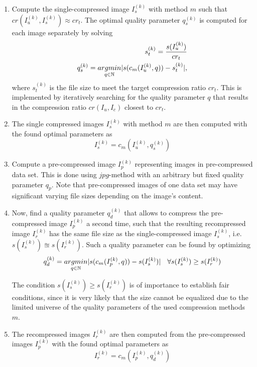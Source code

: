 \documentclass[10pt,twocolumn,letterpaper]{article}
\begin{document}
\begin{enumerate}
	\item Compute the single-compressed image $I_s^{(k)}$ with method $m$ such that $cr(I_u^{(k)}, I_s^{(k)}) \approx cr_t$. The optimal quality parameter $q_s^{(k)}$ is computed for each image separately by solving
	\begin{eqnarray}
	\small
	s_t^{(k)} = \frac{s(I_u^{(k)})}{cr_t} \\
		q_s^{(k)} = \underset{q \in \mathbb{N}}{argmin}|s(c_m(I_u^{(k)},q)) - s_t^{(k)}|,
	\end{eqnarray} where $s_t^{(k)}$ is the file size to meet the target compression ratio $cr_t$. This is implemented by iteratively searching for the quality parameter $q$ that results in the compression ratio $cr(I_u, I_c)$ closest to $cr_t$. 
	\item The single compressed images $I_s^{(k)}$ with method $m$ are then computed with the found optimal parameters as
	\begin{equation}
	I_s^{(k)} = c_m(I_u^{(k)}, q_s^{(k)})
	\end{equation}
	
	\item Compute a pre-compressed image $I_p^{(k)}$ representing images in pre-compressed data set. This is done using $jpg$-method \cite{jpg} with an arbitrary but fixed quality parameter $q_p$. Note that pre-compressed images of one data set may have significant varying file sizes depending on the image's content.
	
	\item Now, find a quality parameter $q_d^{(k)}$ that allows to compress the pre-compressed image $I_p^{(k)}$ a second time, such that the resulting recompressed image $I_r^{(k)}$ has the same file size as the single-compressed image $I_s^{(k)}$, i.e. $s(I_s^{(k)}) \approxeq s(I_r^{(k)})$. Such a quality parameter can be found by optimizing
	\begin{equation}
	\small
		q_d^{(k)} = \underset{q \in \mathbb{N}}{argmin}|s(c_m(I_p^{(k)},q)) - s(I_s^{(k)})| \quad \forall s(I_s^{(k)}) \geq s(I_r^{(k)})
	\end{equation}
	
	The condition $s(I_s^{(k)}) \geq s(I_r^{(k)})$ is of importance to establish fair conditions, since it is very likely that the size cannot be equalized due to the limited universe of the quality parameters of the used compression methods $m$.
	
	\item The recompressed images $I_r^{(k)}$ are then computed from the pre-compressed images $I_p^{(k)}$ with the found optimal parameters as
	\begin{equation}
		I_r^{(k)} = c_m(I_p^{(k)}, q_d^{(k)})
	\end{equation}
	
\end{enumerate}
\end{document}
